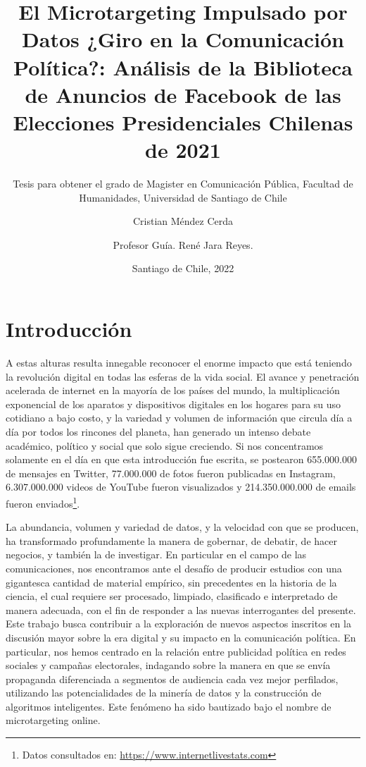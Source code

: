 \documentclass[
  10pt,
  letterpaper,
]{report}
\title{El Microtargeting Impulsado por Datos ¿Giro en la Comunicación
Política?: Análisis de la Biblioteca de Anuncios de Facebook de las
Elecciones Presidenciales Chilenas de 2021}
\subtitle{Tesis para obtener el grado de Magister en Comunicación
Pública, Facultad de Humanidades, Universidad de Santiago de Chile}
\author{Cristian Méndez Cerda \and Profesor Guía. René Jara Reyes.}
\date{Santiago de Chile, 2022}
\begin{document}
\maketitle

\newpage

\setcounter{tocdepth}{5}
\tableofcontents
\centering
\justifying

\newpage

\hypertarget{introducciuxf3n}{%
\chapter{Introducción}\label{introducciuxf3n}}

A estas alturas resulta innegable reconocer el enorme impacto que está
teniendo la revolución digital en todas las esferas de la vida social.
El avance y penetración acelerada de internet en la mayoría de los
países del mundo, la multiplicación exponencial de los aparatos y
dispositivos digitales en los hogares para su uso cotidiano a bajo
costo, y la variedad y volumen de información que circula día a día por
todos los rincones del planeta, han generado un intenso debate
académico, político y social que solo sigue creciendo. Si nos
concentramos solamente en el día en que esta introducción fue escrita,
se postearon 655.000.000 de mensajes en Twitter, 77.000.000 de fotos
fueron publicadas en Instagram, 6.307.000.000 videos de YouTube fueron
visualizados y 214.350.000.000 de emails fueron enviados\footnote{Datos
  consultados en: \url{https://www.internetlivestats.com}}.

La abundancia, volumen y variedad de datos, y la velocidad con que se
producen, ha transformado profundamente la manera de gobernar, de
debatir, de hacer negocios, y también la de investigar. En particular en
el campo de las comunicaciones, nos encontramos ante el desafío de
producir estudios con una gigantesca cantidad de material empírico, sin
precedentes en la historia de la ciencia, el cual requiere ser
procesado, limpiado, clasificado e interpretado de manera adecuada, con
el fin de responder a las nuevas interrogantes del presente. Este
trabajo busca contribuir a la exploración de nuevos aspectos inscritos
en la discusión mayor sobre la era digital y su impacto en la
comunicación política. En particular, nos hemos centrado en la relación
entre publicidad política en redes sociales y campañas electorales,
indagando sobre la manera en que se envía propaganda diferenciada a
segmentos de audiencia cada vez mejor perfilados, utilizando las
potencialidades de la minería de datos y la construcción de algoritmos
inteligentes. Este fenómeno ha sido bautizado bajo el nombre de
microtargeting online.
\end{document}
